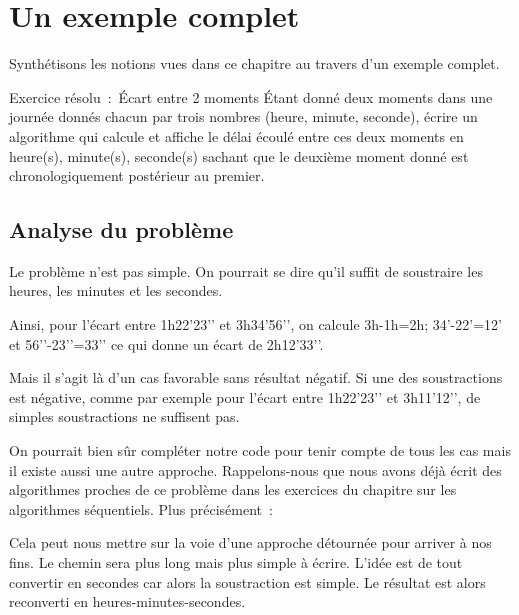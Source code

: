 \section{Un exemple complet}

	Synthétisons les notions vues dans ce chapitre au travers
	d’un exemple complet.
	
	\begin{Emphase}[exercice]{Exercice résolu~:~Écart entre 2 moments}
		Étant donné deux moments dans une journée donnés chacun par trois
		nombres (heure, minute, seconde), écrire un algorithme qui calcule et
		affiche le délai écoulé entre ces deux moments en heure(s), minute(s),
		seconde(s) sachant que le deuxième moment donné est chronologiquement
		postérieur au premier.
	\end{Emphase}
	
	\subsection*{Analyse du problème}
	
		Le problème n’est pas simple. 
		On pourrait se dire qu’il suffit de soustraire les heures, 
		les minutes et les secondes.
	
		Ainsi, pour l’écart entre
		1h22’23’’ et 3h34’56’’, 
		on calcule 3h-1h=2h; 34’-22’=12’ et 56’’-23’’=33’’
		ce qui donne un écart de 2h12’33’’.
	
		Mais il s’agit là d’un cas favorable sans résultat négatif. 
		Si une des soustractions est négative, 
		comme par exemple pour l’écart entre
		1h22’23’’ et 3h11’12’’, 
		de simples soustractions ne suffisent pas.
	
		On pourrait bien sûr compléter notre code 
		pour tenir compte de tous les cas 
		mais il existe aussi une autre approche. 
		Rappelons-nous que nous avons déjà écrit des algorithmes 
		proches de ce problème dans les exercices du chapitre 
		sur les algorithmes séquentiels. 
		Plus précisément~:
	
		\begin{Pseudocode}
		\end{Pseudocode}
	
		Cela peut nous mettre sur la voie d’une approche
		détournée pour arriver à nos fins.
		Le chemin sera plus long mais plus simple à écrire. 
		L’idée est de tout convertir en secondes 
		car alors la soustraction est simple.
		Le résultat est alors reconverti en heures-minutes-secondes.
	
